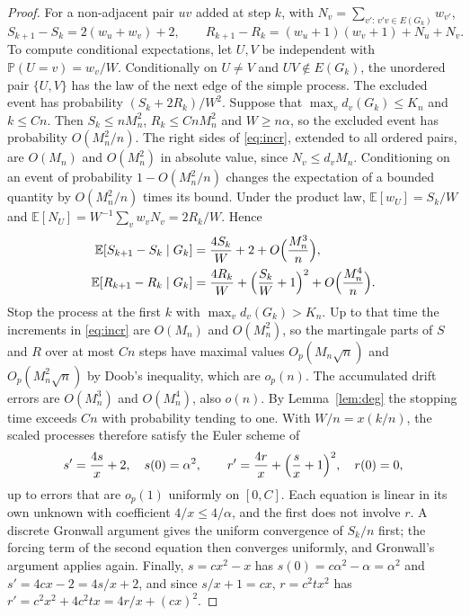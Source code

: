 \documentclass[11pt]{amsart}
\theoremstyle{remark}
\numberwithin{equation}{section}
\newcommand{\PP}{\mathbb{P}}
\newcommand{\EE}{\mathbb{E}}
\begin{document}
\begin{proof}
For a non-adjacent pair $uv$ added at step $k$, with $N_v=\sum_{v':\,v'v\in E(G_k)}w_{v'}$,
\begin{equation}\label{eq:incr}
S_{k+1}-S_k=2(w_u+w_v)+2,\qquad R_{k+1}-R_k=(w_u+1)(w_v+1)+N_u+N_v .
\end{equation}
To compute conditional expectations, let $U,V$ be independent with $\PP(U=v)=w_v/W$. Conditionally on $U\ne V$ and $UV\notin E(G_k)$, the unordered pair $\{U,V\}$ has the law of the next edge of the simple process. The excluded event has probability $(S_k+2R_k)/W^2$. Suppose that $\max_vd_v(G_k)\le K_n$ and $k\le Cn$. Then $S_k\le nM_n^2$, $R_k\le CnM_n^2$ and $W\ge n\alpha$, so the excluded event has probability $O(M_n^2/n)$. The right sides of \eqref{eq:incr}, extended to all ordered pairs, are $O(M_n)$ and $O(M_n^2)$ in absolute value, since $N_v\le d_vM_n$. Conditioning on an event of probability $1-O(M_n^2/n)$ changes the expectation of a bounded quantity by $O(M_n^2/n)$ times its bound. Under the product law, $\EE[w_U]=S_k/W$ and $\EE[N_U]=W^{-1}\sum_vw_vN_v=2R_k/W$. Hence
\begin{align*}
\EE[S_{k+1}-S_k\mid G_k]&=\frac{4S_k}{W}+2+O\Bigl(\frac{M_n^3}{n}\Bigr),\\
\EE[R_{k+1}-R_k\mid G_k]&=\frac{4R_k}{W}+\Bigl(\frac{S_k}{W}+1\Bigr)^2+O\Bigl(\frac{M_n^4}{n}\Bigr).
\end{align*}
Stop the process at the first $k$ with $\max_vd_v(G_k)>K_n$. Up to that time the increments in \eqref{eq:incr} are $O(M_n)$ and $O(M_n^2)$, so the martingale parts of $S$ and $R$ over at most $Cn$ steps have maximal values $O_p(M_n\sqrt n)$ and $O_p(M_n^2\sqrt n)$ by Doob's inequality, which are $o_p(n)$. The accumulated drift errors are $O(M_n^3)$ and $O(M_n^4)$, also $o(n)$. By Lemma~\ref{lem:deg} the stopping time exceeds $Cn$ with probability tending to one. With $W/n=x(k/n)$, the scaled processes therefore satisfy the Euler scheme of
\[
s'=\frac{4s}{x}+2,\quad s(0)=\alpha^2,\qquad r'=\frac{4r}{x}+\Bigl(\frac sx+1\Bigr)^2,\quad r(0)=0,
\]
up to errors that are $o_p(1)$ uniformly on $[0,C]$. Each equation is linear in its own unknown with coefficient $4/x\le4/\alpha$, and the first does not involve $r$. A discrete Gronwall argument gives the uniform convergence of $S_k/n$ first; the forcing term of the second equation then converges uniformly, and Gronwall's argument applies again. Finally, $s=cx^2-x$ has $s(0)=c\alpha^2-\alpha=\alpha^2$ and $s'=4cx-2=4s/x+2$, and since $s/x+1=cx$, $r=c^2tx^2$ has $r'=c^2x^2+4c^2tx=4r/x+(cx)^2$.
\end{proof}
\end{document}
